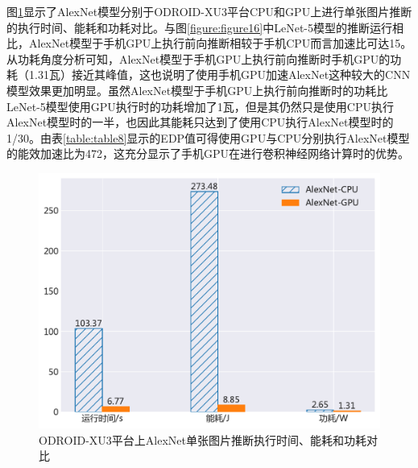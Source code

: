 \begin{table}[htbp]
  \centering
  \caption{AlexNet模型结构中的卷积层和全连接层}
  \label{table:table7}
\end{table}

图\ref{figure:figure18}显示了AlexNet模型分别于ODROID-XU3平台CPU和GPU上进行单张图片推断的执行时间、能耗和功耗对比。与图\ref{figure:figure16}中LeNet-5模型的推断运行相比，AlexNet模型于手机GPU上执行前向推断相较于手机CPU而言加速比可达15。从功耗角度分析可知，AlexNet模型于手机GPU上执行前向推断时手机GPU的功耗（1.31瓦）接近其峰值，这也说明了使用手机GPU加速AlexNet这种较大的CNN模型效果更加明显。虽然AlexNet模型于手机GPU上执行前向推断时的功耗比LeNet-5模型使用GPU执行时的功耗增加了1瓦，但是其仍然只是使用CPU执行AlexNet模型时的一半，也因此其能耗只达到了使用CPU执行AlexNet模型时的1/30。由表\ref{table:table8}显示的EDP值可得使用GPU与CPU分别执行AlexNet模型的能效加速比为472，这充分显示了手机GPU在进行卷积神经网络计算时的优势。

\begin{figure}[htbp]
    \centering
    \includegraphics[height=0.45\textwidth]{figures/alexnet_energy.pdf}
    \caption{ODROID-XU3平台上AlexNet单张图片推断执行时间、能耗和功耗对比}\label{figure:figure18}
\end{figure}

